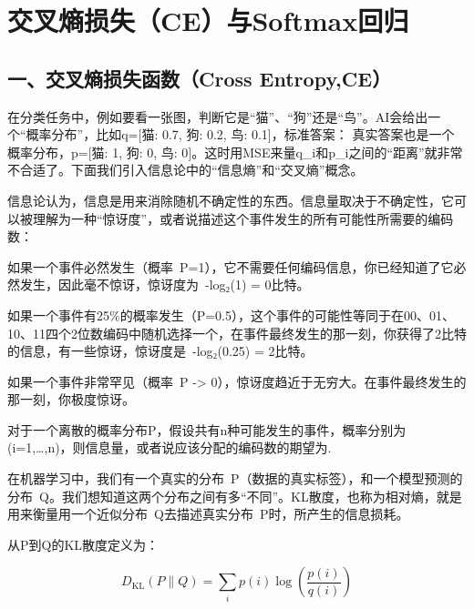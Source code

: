 \setcounter{section}{4}

\hypertarget{ux4ea4ux53c9ux71b5ux635fux5931ceux4e0esoftmaxux56deux5f52}{%
\section{交叉熵损失（CE）与Softmax回归}\label{ux4ea4ux53c9ux71b5ux635fux5931ceux4e0esoftmaxux56deux5f52}}

\hypertarget{ux4e00ux4ea4ux53c9ux71b5ux635fux5931ux51fdux6570cross-entropyce}{%
\subsection{一、交叉熵损失函数（Cross Entropy,CE）}\label{ux4e00ux4ea4ux53c9ux71b5ux635fux5931ux51fdux6570cross-entropyce}}

在分类任务中，例如要看一张图，判断它是``猫''、``狗''还是``鸟''。AI会给出一个``概率分布''，比如q={[}猫: 0.7, 狗: 0.2, 鸟: 0.1{]}，标准答案： 真实答案也是一个概率分布，p={[}猫: 1, 狗: 0, 鸟: 0{]}。这时用MSE来量q\_i和p\_i之间的``距离''就非常不合适了。下面我们引入信息论中的``信息熵''和``交叉熵''概念。

信息论认为，信息是用来消除随机不确定性的东西。信息量取决于不确定性，它可以被理解为一种``惊讶度''，或者说描述这个事件发生的所有可能性所需要的编码数：

如果一个事件必然发生（概率~P=1），它不需要任何编码信息，你已经知道了它必然发生，因此毫不惊讶，惊讶度为~-log₂(1) = 0比特。

如果一个事件有25\%的概率发生（P=0.5），这个事件的可能性等同于在00、01、10、11四个2位数编码中随机选择一个，在事件最终发生的那一刻，你获得了2比特的信息，有一些惊讶，惊讶度是~-log₂(0.25) = 2比特。

如果一个事件非常罕见（概率~P -\textgreater{} 0），惊讶度趋近于无穷大。在事件最终发生的那一刻，你极度惊讶。

对于一个离散的概率分布P，假设共有n种可能发生的事件，概率分别为(i=1,\ldots,n)，则信息量，或者说应该分配的编码数的期望为.

在机器学习中，我们有一个真实的分布~P（数据的真实标签），和一个模型预测的分布~Q。我们想知道这两个分布之间有多``不同''。KL散度，也称为相对熵，就是用来衡量用一个近似分布~Q去描述真实分布~P时，所产生的信息损耗。

从P到Q的KL散度定义为：

\[
D_{\mathrm{KL}}(P \parallel Q)=\sum_i p(i)\log\left(\frac{p(i)}{q(i)}\right)
\]

